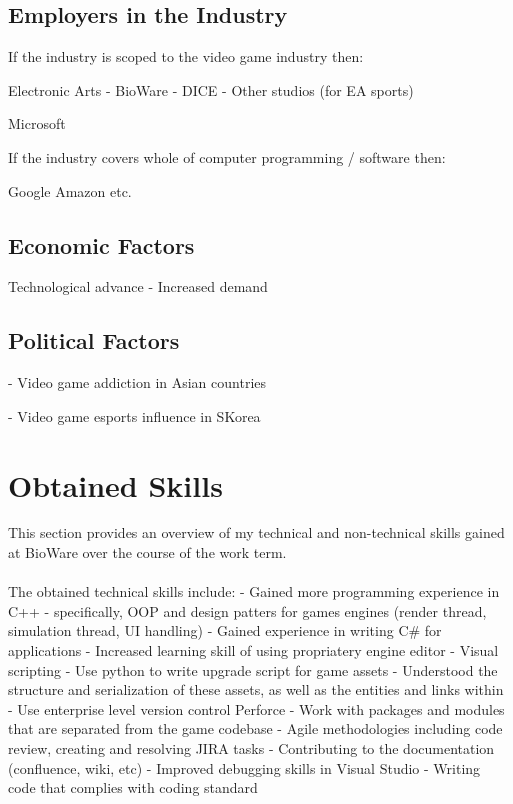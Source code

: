 \documentclass[10pt,letterpaper]{article}
\begin{document}
\subsection{Employers in the Industry}

If the industry is scoped to the video game industry then:

Electronic Arts
- BioWare
- DICE
- Other studios (for EA sports)

Microsoft

If the industry covers whole of computer programming / software then:

Google
Amazon
etc.



\subsection{Economic Factors}

Technological advance
- Increased demand

\subsection{Political Factors}

- Video game addiction in Asian countries

- Video game esports influence in SKorea

\section{Obtained Skills}\label{obtained-skills}

This section provides an overview of my technical and non-technical skills gained at BioWare over the course of the work term. \\
\\

The obtained technical skills include:
- Gained more programming experience in C++
- specifically, OOP and design patters for games engines (render thread, simulation thread, UI handling)
- Gained experience in writing C\# for applications
- Increased learning skill of using propriatery engine editor
- Visual scripting
- Use python to write upgrade script for game assets
- Understood the structure and serialization of these assets, as well as the entities and links within
- Use enterprise level version control Perforce
- Work with packages and modules that are separated from the game codebase
- Agile methodologies including code review, creating and resolving JIRA tasks
- Contributing to the documentation (confluence, wiki, etc)
- Improved debugging skills in Visual Studio
- Writing code that complies with coding standard
\end{document}
